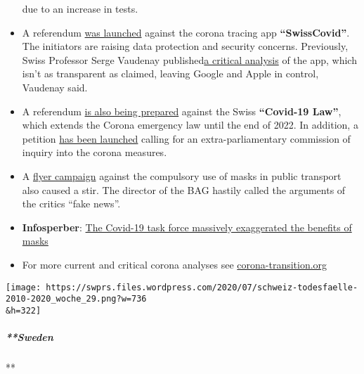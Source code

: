 \begin{itemize}
  due to an increase in tests.
\item
  A referendum
  \href{https://corona-transition.org/referendum-gegen-die-swisscovid-app-gestartet}{was
  launched} against the corona tracing app \textbf{``SwissCovid''}. The
  initiators are raising data protection and security concerns.
  Previously, Swiss Professor Serge Vaudenay
  published\href{https://swprs.org/corona-app-ein-eklatanter-betrug/}{a
  critical analysis} of the app, which isn't as transparent as claimed,
  leaving Google and Apple in control, Vaudenay said.
\item
  A referendum \href{https://notrecht-referendum.ch/}{is also being
  prepared} against the Swiss \textbf{``Covid-19 Law''}, which extends
  the Corona emergency law until the end of 2022. In addition, a
  petition \href{https://fruehling2020.com/}{has been launched} calling
  for an extra-parliamentary commission of inquiry into the corona
  measures.
\item
  A
  \href{https://www.20min.ch/story/bag-warnt-vor-fake-news-flyer-der-maskengegner-559612676323}{flyer
  campaign} against the compulsory use of masks in public transport also
  caused a stir. The director of the BAG hastily called the arguments of
  the critics ``fake news''.
\item
  \textbf{Infosperber}:
  \href{https://www.infosperber.ch/Artikel/Gesundheit/Task-Force-tauscht-Offentlichkeit-uber-den-Nutzen-der-Masken}{The
  Covid-19 task force massively exaggerated the benefits of masks}
\item
  For more current and critical corona analyses see
  \href{https://corona-transition.org/}{corona-transition.org}
\end{itemize}

\texttt{[image: https://swprs.files.wordpress.com/2020/07/schweiz-todesfaelle-2010-2020\_woche\_29.png?w=736\\\&h=322]}

\hypertarget{sweden}{%
\subparagraph{**Sweden}\label{sweden}}

**

